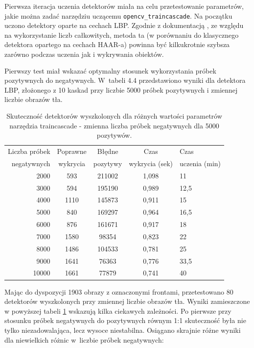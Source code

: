Pierwsza iteracja uczenia detektorów miała na celu przetestowanie
parametrów, jakie można zadać narzędziu uczącemu \verb|opencv_traincascade|.
Na początku
uczono detektory oparte na
cechach LBP. Zgodnie z dokumentacją \cite{OCV:cascadeclassifiertraining}, ze względu na wykorzystanie liczb całkowitych,
metoda ta (w porównaniu do klasycznego detektora opartego na cechach HAAR-a) powinna być
kilkukrotnie szybsza zarówno podczas uczenia jak i wykrywania obiektów.

Pierwszy test miał wskazać optymalny stosunek wykorzystania próbek pozytywnych
do negatywnych. W~tabeli 4.4 przedstawiono wyniki dla detektora LBP, 
złożonego z 10 kaskad
przy liczbie 5000 próbek pozytywnych i zmiennej liczbie obrazów tła.

\begin{table}[!h]
	\centering                                                          
	\caption{Skuteczność detektorów wyszkolonych 
		dla różnych wartości parametrów narzędzia traincascade 
		- zmienna liczba próbek negatywnych dla 5000 pozytywów.
	}
	\begin{tabular}{r|c|c|c|l}
		Liczba próbek & Poprawne & Błędne   & Czas         & Czas    \\
		negatywnych   & wykrycia & pozytywy & wykrycia (sek) & uczenia (min) \\
		\hline
		2000        & 593      & 211002   & 1,098       & 11 \\
		3000        & 594      & 195190   & 0,989       & 12,5 \\
		4000        & 1110     & 145873   & 0,911       & 15 \\
		5000        & 840      & 169297   & 0,964       & 16,5 \\
		6000        & 876      & 161671   & 0,917       & 18 \\
		7000        & 1580     & 98354    & 0,823       & 22 \\
		8000        & 1486     & 104533   & 0,781       & 25 \\
		9000        & 1641     & 76363    & 0,776       & 33,5 \\
		10000       & 1661     & 77879    & 0,741       & 40 \\
	\end{tabular} 
	\label{tab:it1detectorlist}
\end{table}

Mając do dyspozycji 1903 obrazy z oznaczonymi frontami, przetestowano 80 detektorów
wyszkolonych przy zmiennej liczbie obrazów tła. Wyniki zamieszczone w powyższej tabeli
\ref{tab:it1detectorlist} wskazują kilka ciekawych zależności. Po pierwsze przy stosunku próbek negatywnych do
pozytywnych równym 1:1 skuteczność była nie tylko niezadowalająca, lecz wysoce niestabilna.
Osiągano skrajnie różne wyniki dla niewielkich 
różnic w~liczbie próbek negatywnych:

